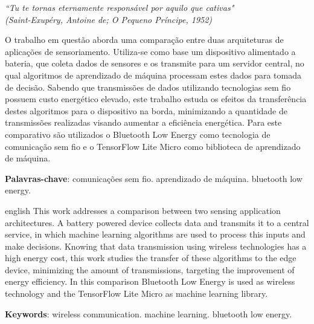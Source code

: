 \documentclass[a5paper]{ufsc-thesis}  %
\begin{document}
\begin{epigrafe}
    \vspace*{\fill}
	\begin{flushright}
		\textit{``Tu te tornas eternamente responsável por aquilo que cativas"\\
		(Saint-Exupéry, Antoine de; O Pequeno Príncipe, 1952)}
	\end{flushright}
\end{epigrafe}


\setlength{\absparsep}{18pt} %

\begin{resumo}
 \noindent O trabalho em questão aborda uma comparação entre duas arquiteturas de aplicações de sensoriamento. Utiliza-se como base um dispositivo alimentado a bateria, que coleta dados de sensores e os transmite para um servidor central, no qual algoritmos de aprendizado de máquina processam estes dados para tomada de decisão. Sabendo que transmissões de dados utilizando tecnologias sem fio possuem custo energético elevado, este trabalho estuda os efeitos da transferência destes algoritmos para o dispositivo na borda, minimizando a quantidade de transmissões realizadas visando aumentar a eficiência energética. Para este comparativo são utilizados o Bluetooth Low Energy como tecnologia de comunicação sem fio e o TensorFlow Lite Micro como biblioteca de aprendizado de máquina. 
 
 \vspace{\onelineskip}
 
 \noindent \textbf{Palavras-chave}: comunicações sem fio. aprendizado de máquina. bluetooth low energy.
 \end{resumo}


\begin{resumo}[Abstract]
 \begin{otherlanguage*}{english}
   \noindent This work addresses a comparison between two sensing application architectures. A battery powered device collects data and transmits it to a central service, in which machine learning algorithms are used to process this inputs and make decisions. Knowing that data transmission using wireless technologies has a high energy cost, this work studies the transfer of these algorithms to the edge device, minimizing the amount of transmissions, targeting the improvement of energy efficiency. In this comparison Bluetooth Low Energy is used as wireless technology and the TensorFlow Lite Micro as machine learning library.

   \vspace{\onelineskip}
 
   \noindent 
   \textbf{Keywords}: wireless communication. machine learning. bluetooth low energy.
 \end{otherlanguage*}
\end{resumo}
\end{document}

